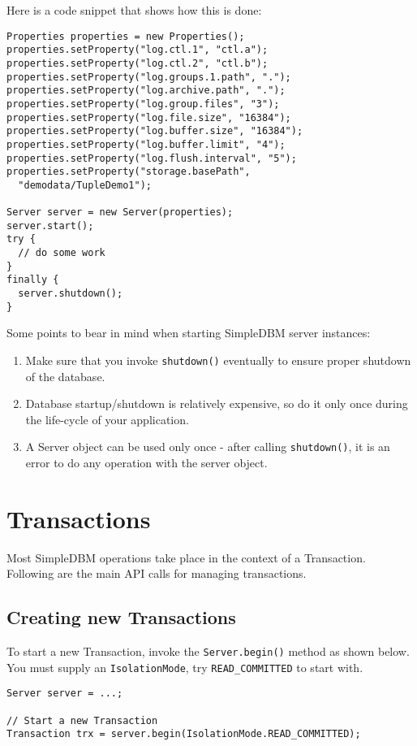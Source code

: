 \documentclass[a4paper,draft,oneside]{book}
\begin{document}
Here is a code snippet that shows how this is done:

\begin{verbatim}
Properties properties = new Properties();
properties.setProperty("log.ctl.1", "ctl.a");
properties.setProperty("log.ctl.2", "ctl.b");
properties.setProperty("log.groups.1.path", ".");
properties.setProperty("log.archive.path", ".");
properties.setProperty("log.group.files", "3");
properties.setProperty("log.file.size", "16384");
properties.setProperty("log.buffer.size", "16384");
properties.setProperty("log.buffer.limit", "4");
properties.setProperty("log.flush.interval", "5");
properties.setProperty("storage.basePath", 
  "demodata/TupleDemo1");

Server server = new Server(properties);
server.start();
try {
  // do some work
}
finally {
  server.shutdown();
}
\end{verbatim}

Some points to bear in mind when starting SimpleDBM server instances:

\begin{enumerate}
\item Make sure that you invoke \verb|shutdown()| eventually to ensure proper
  shutdown of the database.
\item Database startup/shutdown is relatively expensive, so do it only
  once during the life-cycle of your application.
\item A Server object can be used only once - after calling
  \verb|shutdown()|, it is an error to do any operation with the server
  object.
\end{enumerate}

\chapter{Transactions}

Most SimpleDBM operations take place in the context of a Transaction.
Following are the main API calls for managing transactions.

\section{Creating new Transactions}

To start a new Transaction, invoke the \verb|Server.begin()| method as
shown below. You must supply an \verb|IsolationMode|, try
\verb|READ_COMMITTED| to start with.

\begin{verbatim}
Server server = ...;

// Start a new Transaction
Transaction trx = server.begin(IsolationMode.READ_COMMITTED);

\end{verbatim}
\end{document}
